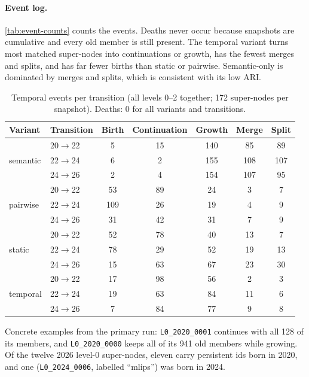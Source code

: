 \documentclass[11pt,a4paper]{article}
\newcommand{\Cref}[1]{\autoref{#1}}
\theoremstyle{remark}
\newcommand{\code}[1]{\texttt{\small #1}}
\begin{document}
\paragraph{Event log.}
\Cref{tab:event-counts} counts the events. Deaths never occur because snapshots are
cumulative and every old member is still present. The temporal variant turns most matched
super-nodes into continuations or growth, has the fewest merges and splits, and has far
fewer births than static or pairwise.
Semantic-only is dominated by merges and splits, which is consistent with its low ARI.

\begin{table}[!htbp]
\centering
\caption{Temporal events per transition (all levels 0--2 together; 172 super-nodes per
snapshot). Deaths: 0 for all variants and transitions.}
\label{tab:event-counts}
\small
\begin{tabular}{llccccc}
\toprule
Variant & Transition & Birth & Continuation & Growth & Merge & Split\\
\midrule
\multirow{3}{*}{semantic} & 20$\to$22 & 5 & 15 & 140 & 85 & 89\\
 & 22$\to$24 & 6 & 2 & 155 & 108 & 107\\
 & 24$\to$26 & 2 & 4 & 154 & 107 & 95\\
\midrule
\multirow{3}{*}{pairwise} & 20$\to$22 & 53 & 89 & 24 & 3 & 7\\
 & 22$\to$24 & 109 & 26 & 19 & 4 & 9\\
 & 24$\to$26 & 31 & 42 & 31 & 7 & 9\\
\midrule
\multirow{3}{*}{static} & 20$\to$22 & 52 & 78 & 40 & 13 & 7\\
 & 22$\to$24 & 78 & 29 & 52 & 19 & 13\\
 & 24$\to$26 & 15 & 63 & 67 & 23 & 30\\
\midrule
\multirow{3}{*}{temporal} & 20$\to$22 & 17 & 98 & 56 & 2 & 3\\
 & 22$\to$24 & 19 & 63 & 84 & 11 & 6\\
 & 24$\to$26 & 7 & 84 & 77 & 9 & 8\\
\bottomrule
\end{tabular}
\end{table}

Concrete examples from the primary run: \code{L0\_2020\_0001} continues with all 128 of its
members, and \code{L0\_2020\_0000} keeps all of its 941 old members while growing. Of the
twelve 2026 level-0 super-nodes, eleven carry persistent ids born in 2020, and one
(\code{L0\_2024\_0006}, labelled ``mlips'') was born in 2024.
\end{document}
